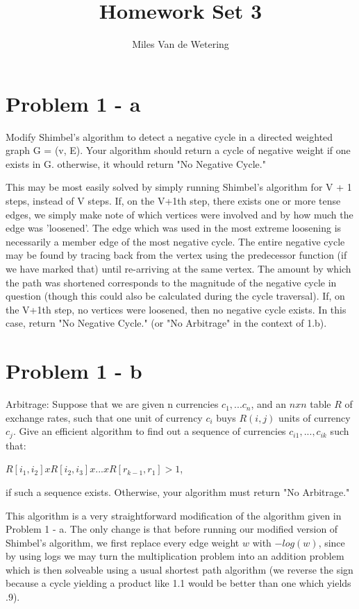 \documentclass[]{report}
\title{Homework Set 3}
\author{Miles Van de Wetering}
\begin{document}
\maketitle

\section*{Problem 1 - a}
Modify Shimbel's algorithm to detect a negative cycle in a directed weighted graph G = (v, E). Your algorithm should return a cycle of negative weight if one exists in G. otherwise, it whould return "No Negative Cycle."

This may be most easily solved by simply running Shimbel's algorithm for V + 1 steps, instead of V steps. If, on the V+1th step, there exists one or more tense edges, we simply make note of which vertices were involved and by how much the edge was 'loosened'. The edge which was used in the most extreme loosening is necessarily a member edge of the most negative cycle. The entire negative cycle may be found by tracing back from the vertex using the predecessor function (if we have marked that) until re-arriving at the same vertex. The amount by which the path was shortened corresponds to the magnitude of the negative cycle in question (though this could also be calculated during the cycle traversal). If, on the V+1th step, no vertices were loosened, then no negative cycle exists. In this case, return "No Negative Cycle." (or "No Arbitrage" in the context of 1.b).

\section*{Problem 1 - b}
Arbitrage:
Suppose that we are given n currencies $c_1, ... c_n$, and an $n x n$ table $R$ of exchange rates, such that one unit of currency $c_i$ buys $R(i, j)$ units of currency $c_j$. Give an efficient algorithm to find out a sequence of currencies $c_{i1}, ..., c_{ik}$ such that:

	$R[i_1, i_2] x R[i_2, i_3] x ... x R[r_{k-1}, r_1] > 1$,

if such a sequence exists. Otherwise, your algorithm must return "No Arbitrage."

This algorithm is a very straightforward modification of the algorithm given in Problem 1 - a. The only change is that before running our modified version of Shimbel's algorithm, we first replace every edge weight $w$ with $-log(w)$, since by using logs we may turn the multiplication problem into an addition problem which is then solveable using a usual shortest path algorithm (we reverse the sign because a cycle yielding a product like 1.1 would be better than one which yields .9).
\end{document}
